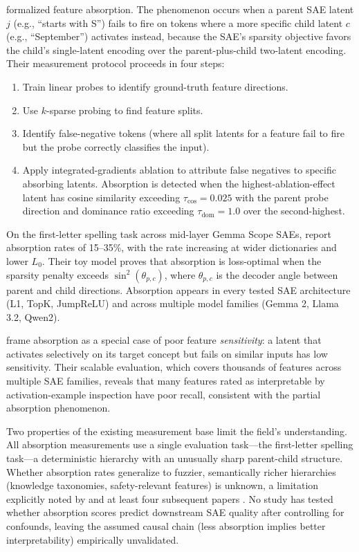 \documentclass{article}
\begin{document}
\citet{chanin2024absorption} formalized feature absorption.
The phenomenon occurs when a parent SAE latent $j$ (e.g., ``starts with S'') fails to fire on tokens where a more specific child latent $c$ (e.g., ``September'') activates instead, because the SAE's sparsity objective favors the child's single-latent encoding over the parent-plus-child two-latent encoding.
Their measurement protocol proceeds in four steps:
\begin{enumerate}
\item Train linear probes to identify ground-truth feature directions.
\item Use $k$-sparse probing to find feature splits.
\item Identify false-negative tokens (where all split latents for a feature fail to fire but the probe correctly classifies the input).
\item Apply integrated-gradients ablation to attribute false negatives to specific absorbing latents. Absorption is detected when the highest-ablation-effect latent has cosine similarity exceeding $\tau_{\text{cos}} = 0.025$ with the parent probe direction and dominance ratio exceeding $\tau_{\text{dom}} = 1.0$ over the second-highest.
\end{enumerate}

On the first-letter spelling task across mid-layer Gemma Scope SAEs, \citet{chanin2024absorption} report absorption rates of 15--35\%, with the rate increasing at wider dictionaries and lower $L_0$.
Their toy model proves that absorption is loss-optimal when the sparsity penalty exceeds $\sin^2(\theta_{p,c})$, where $\theta_{p,c}$ is the decoder angle between parent and child directions.
Absorption appears in every tested SAE architecture (L1, TopK, JumpReLU) and across multiple model families (Gemma 2, Llama 3.2, Qwen2).

\citet{tian2025sensitivity} frame absorption as a special case of poor feature \emph{sensitivity}: a latent that activates selectively on its target concept but fails on similar inputs has low sensitivity.
Their scalable evaluation, which covers thousands of features across multiple SAE families, reveals that many features rated as interpretable by activation-example inspection have poor recall, consistent with the partial absorption phenomenon.

Two properties of the existing measurement base limit the field's understanding.
All absorption measurements use a single evaluation task---the first-letter spelling task---a deterministic hierarchy with an unusually sharp parent-child structure.
Whether absorption rates generalize to fuzzier, semantically richer hierarchies (knowledge taxonomies, safety-relevant features) is unknown, a limitation explicitly noted by \citet{chanin2024absorption} and at least four subsequent papers \citep{karvonen2025saebench,korznikov2025ortsae,bussmann2025matryoshka,li2025atm}.
No study has tested whether absorption scores predict downstream SAE quality after controlling for confounds, leaving the assumed causal chain (less absorption implies better interpretability) empirically unvalidated.
\end{document}
